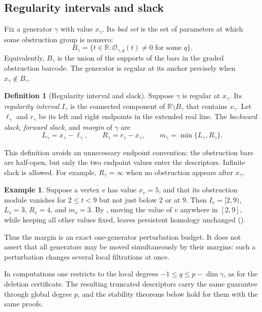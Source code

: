 \documentclass[11pt,letterpaper]{article}
\theoremstyle{definition}
\newtheorem{definition}[theorem]{Definition}
\newtheorem{example}[theorem]{Example}
\newcommand{\Oc}{\mathcal O}
\begin{document}
\subsection{Regularity intervals and slack}

Fix a generator $\gamma$ with value $x_\gamma$. Its \emph{bad set} is the set
of parameters at which some obstruction group is nonzero:
$$
B_\gamma
=\{t\in\mathbb R:\Oc_{\gamma,q}(t)\neq0
  \text{ for some }q\}.
$$
Equivalently, $B_\gamma$ is the union of the supports of the bars in the
graded obstruction barcode. The generator is regular at its anchor precisely
when $x_\gamma\notin B_\gamma$.

\begin{definition}[Regularity interval and slack]
\label{def:regularity-interval}
Suppose $\gamma$ is regular at $x_\gamma$. Its \emph{regularity interval}
$I_\gamma$ is the connected component of $\mathbb R\setminus B_\gamma$ that
contains $x_\gamma$. Let $\ell_\gamma$ and $r_\gamma$ be its left and right
endpoints in the extended real line. The \emph{backward slack}, \emph{forward
slack}, and \emph{margin} of $\gamma$ are
$$
L_\gamma=x_\gamma-\ell_\gamma,
\qquad
R_\gamma=r_\gamma-x_\gamma,
\qquad
m_\gamma=\min\{L_\gamma,R_\gamma\}.
$$
\end{definition}

This definition avoids an unnecessary endpoint convention: the obstruction
bars are half-open, but only the two endpoint values enter the descriptors.
Infinite slack is allowed. For example, $R_\gamma=\infty$ when no obstruction
appears after $x_\gamma$.

\begin{example}
\label{ex:sublevel-vertex}
Suppose a vertex $v$ has value $x_v=5$, and that its obstruction module
vanishes for $2\leq t<9$ but not just below $2$ or at $9$. Then
$I_v=[2,9)$, $L_v=3$, $R_v=4$, and $m_v=3$. By ,
moving the value of $v$ anywhere in $[2,9]$, while keeping all other values
fixed, leaves persistent homology unchanged ().
\end{example}

Thus the margin is an exact one-generator perturbation budget. It does not
assert that all generators may be moved simultaneously by their margins: such
a perturbation changes several local filtrations at once.

In computations one restricts to the local degrees $-1\leq q\leq p-\dim\gamma$,
as for the deletion certificate. The resulting truncated descriptors carry the
same guarantee through global degree $p$, and the stability theorems below
hold for them with the same proofs.
\end{document}
